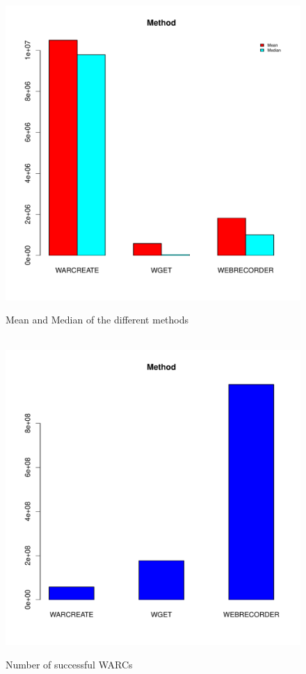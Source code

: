 \documentclass[12pt]{article}
\begin{document}
\begin{figure}[H]
    \caption{Mean and Median of the different methods}
    \centering
    \includegraphics{sizeStats.pdf}
\end{figure}

\begin{figure}[H]
    \caption{Number of successful WARCs}
    \centering
    \includegraphics{warcstats.pdf}
\end{figure}
\end{document}

